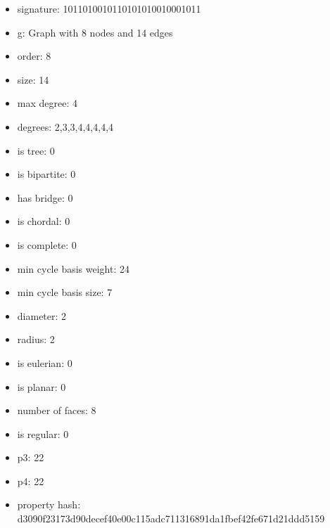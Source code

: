 \begin{itemize}
\item signature: 1011010010110101010010001011
\item g: Graph with 8 nodes and 14 edges
\item order: 8
\item size: 14
\item max degree: 4
\item degrees: 2,3,3,4,4,4,4,4
\item is tree: 0
\item is bipartite: 0
\item has bridge: 0
\item is chordal: 0
\item is complete: 0
\item min cycle basis weight: 24
\item min cycle basis size: 7
\item diameter: 2
\item radius: 2
\item is eulerian: 0
\item is planar: 0
\item number of faces: 8
\item is regular: 0
\item p3: 22
\item p4: 22
\item property hash: d3090f23173d90decef40e00c115adc711316891da1fbef42fe671d21ddd5159
\end{itemize}
\newpage
\begin{figure}
\end{figure}
